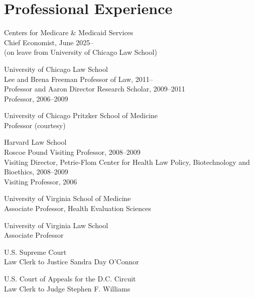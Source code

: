 \documentclass[11pt,letterpaper]{report}
\begin{document}

    \section*{Professional Experience}
    
    \begin{tablist}

        \item[2025--]   \tab{}Centers for Medicare \& Medicaid Services \\
                              Chief Economist, June 2025-- \\
                              (on leave from University of Chicago Law School)

        \item[2006--]   \tab{}University of Chicago Law School \\
                              Lee and Brena Freeman Professor of Law, 2011--\\
                              Professor and Aaron Director Research Scholar, 2009--2011 \\
                              Professor, 2006--2009
    
        \item[2010--]   \tab{}University of Chicago Pritzker School of Medicine \\
                              Professor (courtesy)
    
        \item[2008--09] \tab{}Harvard Law School \\
                              Roscoe Pound Visiting Professor, 2008--2009\\
                              Visiting Director, Petrie-Flom Center for Health Law Policy, Biotechnology and Bioethics, 2008--2009 \\
                              Visiting Professor, 2006
    
        \item[2004--06] \tab{}University of Virginia School of Medicine \\
                              Associate Professor, Health Evaluation Sciences
    
        \item[2002--06] \tab{}University of Virginia Law School \\
                              Associate Professor
    
        \item[2001--02] \tab{}U.S. Supreme Court \\
                              Law Clerk to Justice Sandra Day O'Connor
    
        \item[2000--01] \tab{}U.S. Court of Appeals for the D.C. Circuit \\
                              Law Clerk to Judge Stephen F. Williams
    
    \end{tablist}
\end{document}

